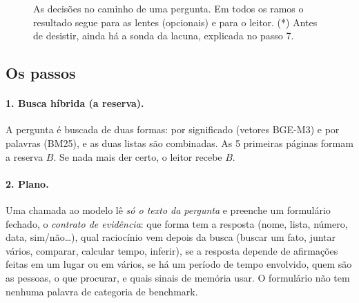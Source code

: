 \documentclass[11pt]{article}
\begin{document}
\begin{figure}[h]
\centering
{}
\caption{As decisões no caminho de uma pergunta. Em todos os ramos o
resultado segue para as lentes (opcionais) e para o leitor. (*) Antes de
desistir, ainda há a sonda da lacuna, explicada no passo 7.}
\label{fig:percurso}
\end{figure}

\subsection{Os passos}

\paragraph{1. Busca híbrida (a reserva).}
A pergunta é buscada de duas formas: por significado (vetores BGE-M3) e por
palavras (BM25), e as duas listas são combinadas. As 5 primeiras páginas
formam a reserva $B$. Se nada mais der certo, o leitor recebe $B$.

\paragraph{2. Plano.}
Uma chamada ao modelo lê \emph{só o texto da pergunta} e preenche um
formulário fechado, o \emph{contrato de evidência}: que forma tem a resposta
(nome, lista, número, data, sim/não\dots), qual raciocínio vem depois da busca
(buscar um fato, juntar vários, comparar, calcular tempo, inferir), se a
resposta depende de afirmações feitas em um lugar ou em vários, se há um
período de tempo envolvido, quem são as pessoas, o que procurar, e quais
sinais de memória usar. O formulário não tem nenhuma palavra de categoria de
benchmark.
\end{document}
